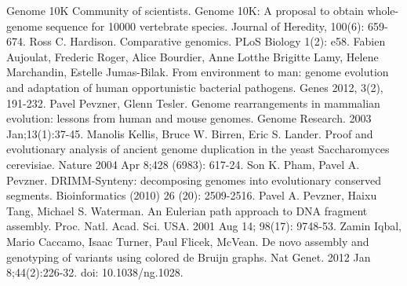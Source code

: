 \documentclass[a4paper, 12pt]{scrartcl}
\begin{document}
\begin{thebibliography}{9}
	Genome 10K Community of scientists.
	Genome 10K: A proposal to obtain whole-genome sequence for 10000 vertebrate species.
	Journal of Heredity, 100(6): 659-674.
	Ross C. Hardison.
	Comparative genomics.
	PLoS Biology 1(2): e58.
	Fabien Aujoulat, Frederic Roger, Alice Bourdier, Anne Lotthe  Brigitte Lamy, Helene Marchandin, Estelle Jumas-Bilak.
	From environment to man: genome evolution and adaptation of human opportunistic bacterial pathogens.
	Genes 2012, 3(2), 191-232.
	Pavel Pevzner, Glenn Tesler.
	Genome rearrangements in mammalian evolution: lessons from human and mouse genomes.
	Genome Research. 2003 Jan;13(1):37-45.
	Manolis Kellis, Bruce W. Birren, Eric S. Lander.
	Proof and evolutionary analysis of ancient genome duplication in the yeast Saccharomyces cerevisiae.
	Nature 2004 Apr 8;428 (6983): 617-24.
	Son K. Pham, Pavel A. Pevzner.
	DRIMM-Synteny: decomposing genomes into evolutionary conserved segments.
	Bioinformatics (2010)  26  (20):  2509-2516.
	Pavel A. Pevzner, Haixu Tang, Michael S. Waterman.
	An Eulerian path approach to DNA fragment assembly.
	Proc. Natl. Acad. Sci. USA. 2001 Aug 14; 98(17): 9748-53.
	Zamin Iqbal, Mario Caccamo, Isaac Turner, Paul Flicek, McVean.
	De novo assembly and genotyping of variants using colored de Bruijn graphs.
	Nat Genet. 2012 Jan 8;44(2):226-32. doi: 10.1038/ng.1028.
\end{thebibliography}
\end{document}
